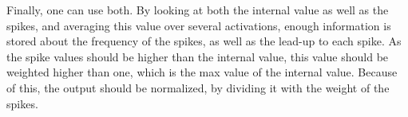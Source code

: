Finally, one can use both. By looking at both the internal value as well as the spikes, and averaging this value over several activations, enough information is stored about the frequency of the spikes, as well as the lead-up to each spike. As the spike values should be higher than the internal value, this value should be weighted higher than one, which is the max value of the internal value. Because of this, the output should be normalized, by dividing it with the weight of the spikes.

















